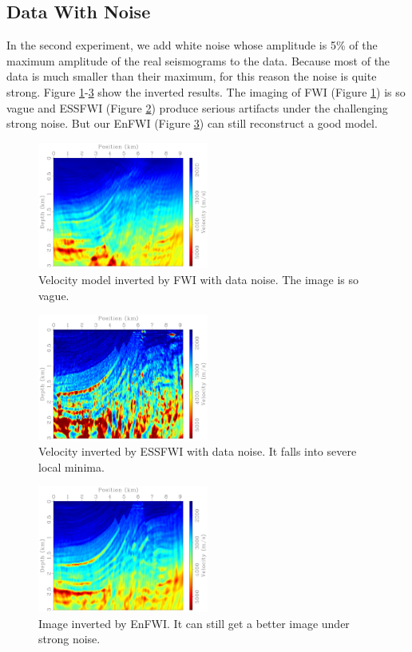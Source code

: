 \documentclass[mreferee]{gji}
\begin{document}
\subsection{Data With Noise}
In the second experiment, we add white noise whose amplitude is 5\% of the maximum amplitude of the real seismograms to the data. Because most of the data is much smaller than their maximum, for this reason the noise is quite strong. Figure \ref{fig:img_fwi_noise}-\ref{fig:img_enfwi_noise}  show the inverted results. The imaging of FWI (Figure \ref{fig:img_fwi_noise}) is so vague and ESSFWI (Figure \ref{fig:img_esfwi_noise}) produce serious artifacts under the challenging strong noise. But our EnFWI (Figure \ref{fig:img_enfwi_noise}) can still reconstruct a good model.

\begin{figure}
\center
\includegraphics[width=0.5\textwidth]{fig/fwi-noise.pdf}
\caption{Velocity model inverted by FWI with data noise. The image is so vague.}
\label{fig:img_fwi_noise}
\end{figure}

\begin{figure}
\center
\includegraphics[width=0.5\textwidth]{fig/esfwi-noise.pdf}
\caption{Velocity inverted by ESSFWI with data noise. It falls into severe local minima.}
\label{fig:img_esfwi_noise}
\end{figure}

\begin{figure}
\center
\includegraphics[width=0.5\textwidth]{fig/enfwi-noise.pdf}
\caption{Image inverted by EnFWI. It can still get a better image under strong noise.}
\label{fig:img_enfwi_noise}
\end{figure}
\end{document}
